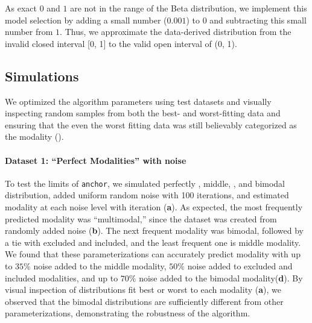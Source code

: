 \addtocounter{figure}{1}
\clearpage



As exact $0$ and $1$ are not in the range of the Beta distribution, we implement this model selection by adding a small number ($0.001$) to $0$ and subtracting this small number from $1$. Thus, we approximate the data-derived distribution from the invalid closed interval [0, 1] to the valid open interval of (0, 1).


\subsection{Simulations}

We optimized the algorithm parameters using test datasets and visually inspecting random samples from both the best- and worst-fitting data and ensuring that the even the worst fitting data was still believably categorized as the modality (\textbf{}).

\paragraph{Dataset 1: ``Perfect Modalities'' with noise}
\label{sec:anchor_perfect_modalities}

To test the limits of \texttt{anchor}, we simulated perfectly \0, middle, \1, and bimodal distribution, added uniform random noise with 100 iterations, and estimated modality at each noise level with iteration (\textbf{a}). As expected, the most frequently predicted modality was ``multimodal,'' since the dataset was created from randomly added noise (\textbf{b}). The next frequent modality was bimodal, followed by a tie with excluded and included, and the least frequent one is middle modality. We found that these parameterizations can accurately predict modality with up to $35\%$ noise added to the middle modality, $50\%$ noise added to excluded and included modalities, and up to $70\%$ noise added to the bimodal modality(\textbf{d}). By visual inspection of distributions fit best or worst to each modality (\textbf{a}), we observed that the bimodal distributions are sufficiently different from other parameterizations, demonstrating the robustness of the algorithm.



